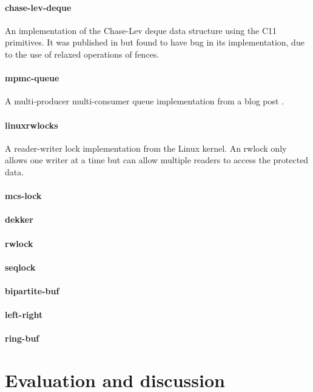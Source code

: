 \paragraph{chase-lev-deque} An implementation of the Chase-Lev deque data structure using the C11 primitives. It was published in \cite{chase-lev-deque-impl} but found to have bug in its implementation, due to the use of relaxed operations of fences. 

\paragraph{mpmc-queue} A multi-producer multi-consumer queue implementation from a blog post \cite{mpmc-queue-impl}. 

\paragraph{linuxrwlocks} A reader-writer lock implementation from the Linux kernel. An rwlock only allows one writer at a time but can allow multiple readers to access the protected data. 


\paragraph{mcs-lock}
\paragraph{dekker}
\paragraph{rwlock}
\paragraph{seqlock}
\paragraph{bipartite-buf}
\paragraph{left-right}
\paragraph{ring-buf}


\section{Evaluation and discussion}

